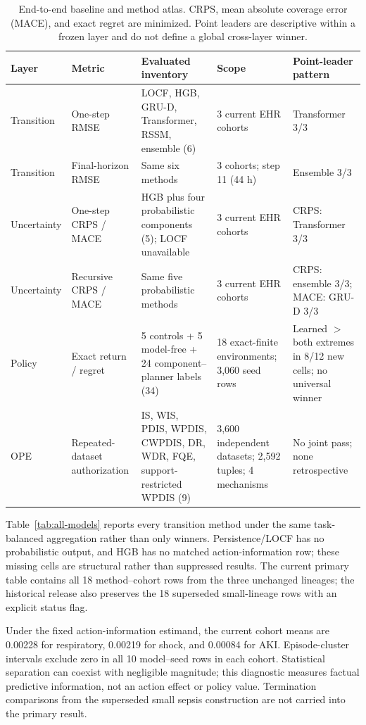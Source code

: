 \documentclass[sigconf,review]{acmart}
\begin{document}
\begin{table}[t]
\centering
\caption{End-to-end baseline and method atlas. CRPS, mean absolute coverage error (MACE), and exact regret are minimized. Point leaders are descriptive within a frozen layer and do not define a global cross-layer winner.}
\label{tab:baseline-atlas}
\scriptsize
\begin{tabularx}{\textwidth}{llXXX}
\toprule
Layer & Metric & Evaluated inventory & Scope & Point-leader pattern \\
\midrule
Transition & One-step RMSE & LOCF, HGB, GRU-D, Transformer, RSSM, ensemble (6) & 3 current EHR cohorts & Transformer 3/3 \\
Transition & Final-horizon RMSE & Same six methods & 3 cohorts; step 11 (44 h) & Ensemble 3/3 \\
Uncertainty & One-step CRPS / MACE & HGB plus four probabilistic components (5); LOCF unavailable & 3 current EHR cohorts & CRPS: Transformer 3/3 \\
Uncertainty & Recursive CRPS / MACE & Same five probabilistic methods & 3 current EHR cohorts & CRPS: ensemble 3/3; MACE: GRU-D 3/3 \\
Policy & Exact return / regret & 5 controls + 5 model-free + 24 component--planner labels (34) & 18 exact-finite environments; 3,060 seed rows & Learned $>$ both extremes in 8/12 new cells; no universal winner \\
OPE & Repeated-dataset authorization & IS, WIS, PDIS, WPDIS, CWPDIS, DR, WDR, FQE, support-restricted WPDIS (9) & 3,600 independent datasets; 2,592 tuples; 4 mechanisms & No joint pass; none retrospective \\
\bottomrule
\end{tabularx}
\end{table}

Table~\ref{tab:all-models} reports every transition method under the same task-balanced aggregation rather than only winners. Persistence/LOCF has no probabilistic output, and HGB has no matched action-information row; these missing cells are structural rather than suppressed results. The current primary table contains all 18 method--cohort rows from the three unchanged lineages; the historical release also preserves the 18 superseded small-lineage rows with an explicit status flag.

Under the fixed action-information estimand, the current cohort means are 0.00228 for respiratory, 0.00219 for shock, and 0.00084 for AKI. Episode-cluster intervals exclude zero in all 10 model--seed rows in each cohort. Statistical separation can coexist with negligible magnitude; this diagnostic measures factual predictive information, not an action effect or policy value. Termination comparisons from the superseded small sepsis construction are not carried into the primary result.
\end{document}
